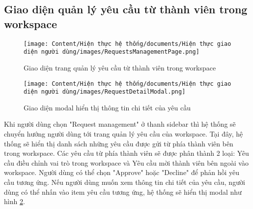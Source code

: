 \subsection{Giao diện quản lý yêu cầu từ thành viên trong workspace}

\begin{figure}[H]
    \centering
    \texttt{[image: Content/Hiện thực hệ thống/documents/Hiện thực giao diện người dùng/images/RequestsManagementPage.png]}
    \vspace{0.5cm}
    \caption{Giao diện trang quản lý yêu cầu từ thành viên trong workspace}
    \label{fig: Giao diện trang quản lý yêu cầu từ thành viên trong workspace}
\end{figure}

\begin{figure}[H]
    \centering
    \texttt{[image: Content/Hiện thực hệ thống/documents/Hiện thực giao diện người dùng/images/RequestDetailModal.png]}
    \vspace{0.5cm}
    \caption{Giao diện modal hiển thị thông tin chi tiết của yêu cầu}
    \label{fig: Giao diện modal hiển thị thông tin chi tiết của yêu cầu}
\end{figure}

Khi người dùng chọn "Request management" ở thanh sidebar thì hệ thống sẽ chuyển hướng người dùng tới trang quản lý yêu cầu của workspace. Tại đây, hệ thống sẽ hiển thị danh sách những yêu cầu được gửi từ phía thành viên bên trong workspace. Các yêu cầu từ phía thành viên sẽ được phân thành 2 loại: Yêu cầu điều chỉnh vai trò trong workspace và Yêu cầu mời thành viên bên ngoài vào workspace. Người dùng có thể chọn "Approve" hoặc "Decline" để phản hồi yêu cầu tương ứng. Nếu người dùng muốn xem thông tin chi tiết của yêu cầu, người dùng có thể nhấn vào item yêu cầu tương ứng, hệ thống sẽ hiển thị modal như hình \ref{fig: Giao diện modal hiển thị thông tin chi tiết của yêu cầu}.